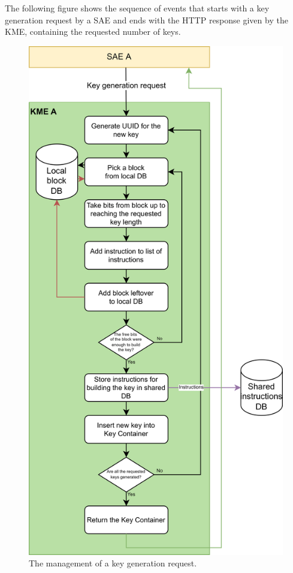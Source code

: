 The following figure shows the sequence of events that starts with a key generation request by a SAE and ends with the HTTP response given by the KME, containing the requested number of keys.

\begin{figure}[H]
    \centering
    \includegraphics{Images/key_generation.png}
    \caption{The management of a key generation request.}
    \label{fig:key_generation}
\end{figure}

